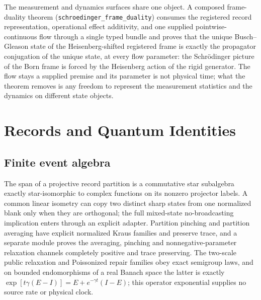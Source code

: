 \documentclass[11pt]{article}
\begin{document}
The measurement and dynamics surfaces share one object. A composed
frame-duality theorem (\texttt{schroedinger\_frame\_duality}) consumes
the registered record representation, operational effect additivity,
and one supplied pointwise-continuous flow through a single typed
bundle and proves that the unique Busch--Gleason state of the
Heisenberg-shifted registered frame is exactly the propagator
conjugation of the unique state, at every flow parameter: the
Schr\"odinger picture of the Born frame is forced by the Heisenberg
action of the rigid generator. The flow stays a supplied premise and
its parameter is not physical time; what the theorem removes is any
freedom to represent the measurement statistics and the dynamics on
different state objects.

\section{Records and Quantum Identities}
\label{sec:records-quantum}

\subsection{Finite event algebra}
\label{sec:finite-event-algebra}

The span of a projective record partition is a commutative star subalgebra
exactly star-isomorphic to complex functions on its nonzero projector labels.
A common linear isometry can copy two distinct sharp states from one
normalized blank only when they are orthogonal; the full mixed-state
no-broadcasting implication enters through an explicit adapter. Partition
pinching and partition averaging have explicit normalized Kraus families and
preserve trace, and a separate module proves the averaging, pinching and
nonnegative-parameter relaxation channels completely positive and trace
preserving. The two-scale public relaxation and Poissonized repair families
obey exact semigroup laws, and on bounded endomorphisms of a real Banach space
the latter is exactly \(\exp[t\gamma(E-I)]=E+e^{-\gamma t}(I-E)\); this
operator exponential supplies no source rate or physical clock.
\end{document}
